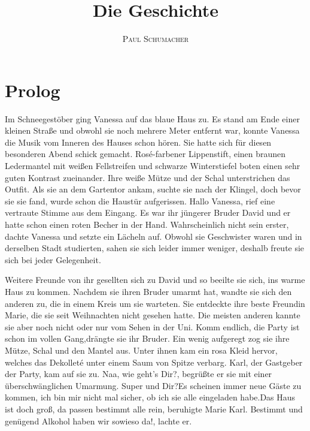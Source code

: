 \documentclass{article}
\title{\textbf{Die Geschichte}}
\author{\textsc{Paul Schumacher}}
\begin{document}
	\maketitle
	
	\section{Prolog}
	
	Im Schneegestöber ging Vanessa auf das blaue Haus zu. Es stand am Ende einer kleinen Straße und obwohl sie noch mehrere Meter entfernt war, konnte Vanessa die Musik vom Inneren des Hauses schon hören. Sie hatte sich für diesen besonderen Abend schick gemacht. Rosé-farbener Lippenstift, einen braunen Ledermantel mit weißen Fellstreifen und schwarze Winterstiefel boten einen sehr guten Kontrast zueinander. Ihre weiße Mütze und der Schal unterstrichen das Outfit. Als sie an dem Gartentor ankam, suchte sie nach der Klingel, doch bevor sie sie fand, wurde schon die Haustür aufgerissen. \guillemotright Hallo Vanessa\guillemotleft, rief eine vertraute Stimme aus dem Eingang. Es war ihr jüngerer Bruder David und er hatte schon einen roten Becher in der Hand. Wahrscheinlich nicht sein erster, dachte Vanessa und setzte ein Lächeln auf. Obwohl sie Geschwister waren und in derselben Stadt studierten, sahen sie sich leider immer weniger, deshalb freute sie sich bei jeder Gelegenheit.
	
	Weitere Freunde von ihr gesellten sich zu David und so beeilte sie sich, ins warme Haus zu kommen. Nachdem sie ihren Bruder umarmt hat, wandte sie sich den anderen zu, die in einem Kreis um sie warteten. Sie entdeckte ihre beste Freundin Marie, die sie seit Weihnachten nicht gesehen hatte. Die meisten anderen kannte sie aber noch nicht oder nur vom Sehen in der Uni. \guillemotright Komm endlich, die Party ist schon im vollen Gang,\guillemotleft drängte sie ihr Bruder. Ein wenig aufgeregt zog sie ihre Mütze, Schal und den Mantel aus. Unter ihnen kam ein rosa Kleid hervor, welches das Dekolleté unter einem Saum von Spitze verbarg. Karl, der Gastgeber der Party, kam auf sie zu. \guillemotright Naa, wie geht’s Dir?\guillemotleft, begrüßte er sie mit einer überschwänglichen Umarmung. \guillemotright Super und Dir?\guillemotleft \guillemotright Es scheinen immer neue Gäste zu kommen, ich bin mir nicht mal sicher, ob ich sie alle eingeladen habe.\guillemotleft \guillemotright Das Haus ist doch groß, da passen bestimmt alle rein\guillemotleft, beruhigte Marie Karl. \guillemotright Bestimmt und genügend Alkohol haben wir sowieso da!\guillemotleft, lachte er.
	
\end{document}

